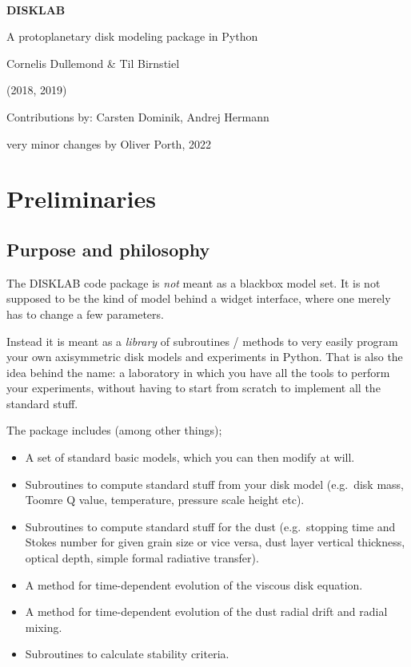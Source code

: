 \documentclass{book}
\begin{document}
\mbox{}
\vspace{9em}\\

\centerline{\Huge\bf\sf DISKLAB}\vspace{1em}
\centerline{\Huge\sf A protoplanetary disk modeling package in Python}\vspace{1em}
\centerline{\large\sf Cornelis Dullemond \& Til Birnstiel}\vspace{1em}
\centerline{\large\sf (2018, 2019)}\vspace{3em}
\centerline{\sf Contributions by: Carsten Dominik, Andrej Hermann}\vspace{1em}
\centerline{\sf very minor changes by Oliver Porth, 2022}\vspace{1em}


\newpage

\tableofcontents

\newpage

\chapter{Preliminaries}

\section{Purpose and philosophy}
The {\sf DISKLAB} code package is {\em not} meant as a blackbox model set.
It is not supposed to be the kind of model behind a widget interface, where
one merely has to change a few parameters.

Instead it is meant as a {\em library} of subroutines / methods to very easily
program your own axisymmetric disk models and experiments in Python. That is
also the idea behind the name: a laboratory in which you have all the tools to
perform your experiments, without having to start from scratch to implement all
the standard stuff.

The package includes (among other things);
\begin{itemize}
\item A set of standard basic models, which you can then modify at will.
\item Subroutines to compute standard stuff from your disk model (e.g.\ disk mass,
  Toomre Q value, temperature, pressure scale height etc).
\item Subroutines to compute standard stuff for the dust (e.g.\ stopping time
  and Stokes number for given grain size or vice versa, dust layer vertical thickness,
  optical depth, simple formal radiative transfer).
\item A method for time-dependent evolution of the viscous disk equation.
\item A method for time-dependent evolution of the dust radial drift and radial mixing.
\item Subroutines to calculate stability criteria.
\end{itemize}
\end{document}
